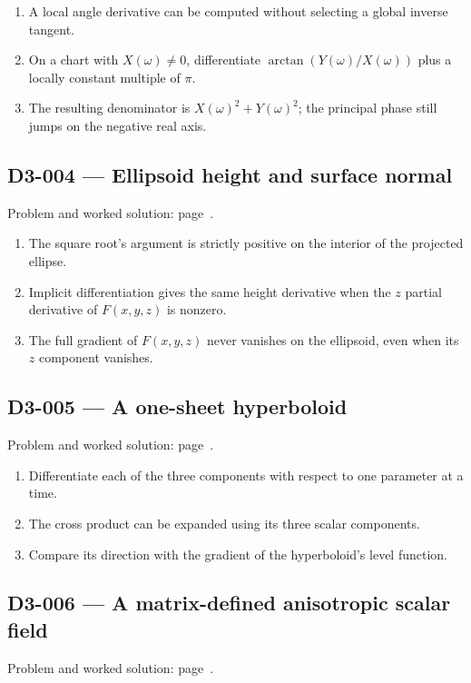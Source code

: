 \documentclass[11pt,oneside,openany]{book}
\begin{document}
\begin{enumerate}
\item A local angle derivative can be computed without selecting a global inverse tangent.
\item On a chart with \(X(\omega)\ne0\), differentiate \(\arctan(Y(\omega)/X(\omega))\) plus a locally constant multiple of \(\pi\).
\item The resulting denominator is \(X(\omega)^2+Y(\omega)^2\); the principal phase still jumps on the negative real axis.
\end{enumerate}
\subsection*{D3-004 --- Ellipsoid height and surface normal}
\label{hints:D3-004}
Problem and worked solution: page~\pageref{problem:D3-004}.

\begin{enumerate}
\item The square root's argument is strictly positive on the interior of the projected ellipse.
\item Implicit differentiation gives the same height derivative when the \(z\) partial derivative of \(F(x,y,z)\) is nonzero.
\item The full gradient of \(F(x,y,z)\) never vanishes on the ellipsoid, even when its \(z\) component vanishes.
\end{enumerate}
\subsection*{D3-005 --- A one-sheet hyperboloid}
\label{hints:D3-005}
Problem and worked solution: page~\pageref{problem:D3-005}.

\begin{enumerate}
\item Differentiate each of the three components with respect to one parameter at a time.
\item The cross product can be expanded using its three scalar components.
\item Compare its direction with the gradient of the hyperboloid's level function.
\end{enumerate}
\subsection*{D3-006 --- A matrix-defined anisotropic scalar field}
\label{hints:D3-006}
Problem and worked solution: page~\pageref{problem:D3-006}.
\end{document}
